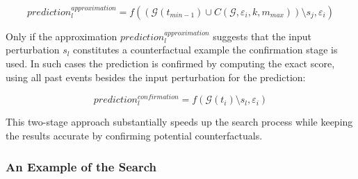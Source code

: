 \begin{equation}
    prediction_l^{approximation} = f((\mathcal{G}(t_{min - 1}) \cup C(\mathcal{G}, \varepsilon_i, k, m_{max})) \setminus s_j, \varepsilon_i)
\end{equation}

Only if the approximation $prediction_l^{approximation}$ suggests that the input perturbation $s_l$ constitutes a counterfactual example the confirmation stage is used. In such cases the prediction is confirmed by computing the exact score, using all past events besides the input perturbation for the prediction:

\begin{equation}
    prediction_l^{confirmation} = f(\mathcal{G}(t_i) \setminus s_l, \varepsilon_i)
\end{equation}

This two-stage approach substantially speeds up the search process while keeping the results accurate by confirming potential counterfactuals.

\subsubsection{An Example of the Search}
\label{s_Methodology_CoDy_Example}

